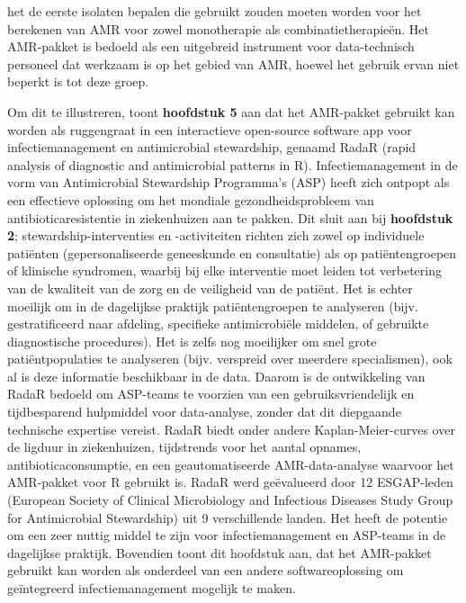 \documentclass[
]{book}
\begin{document}
het de eerste isolaten bepalen die gebruikt zouden moeten worden voor het berekenen van AMR voor zowel monotherapie als combinatietherapieën. Het AMR-pakket is bedoeld als een uitgebreid instrument voor data-technisch personeel dat werkzaam is op het gebied van AMR, hoewel het gebruik ervan niet beperkt is tot deze groep.

Om dit te illustreren, toont \textbf{hoofdstuk 5} aan dat het AMR-pakket gebruikt kan worden als ruggengraat in een interactieve open-source software app voor infectiemanagement en antimicrobial stewardship, genaamd RadaR (rapid analysis of diagnostic and antimicrobial patterns in R). Infectiemanagement in de vorm van Antimicrobial Stewardship Programma's (ASP) heeft zich ontpopt als een effectieve oplossing om het mondiale gezondheidsprobleem van antibioticaresistentie in ziekenhuizen aan te pakken. Dit sluit aan bij \textbf{hoofdstuk 2}; stewardship-interventies en -activiteiten richten zich zowel op individuele patiënten (gepersonaliseerde geneeskunde en consultatie) als op patiëntengroepen of klinische syndromen, waarbij bij elke interventie moet leiden tot verbetering van de kwaliteit van de zorg en de veiligheid van de patiënt. Het is echter moeilijk om in de dagelijkse praktijk patiëntengroepen te analyseren (bijv. gestratificeerd naar afdeling, specifieke antimicrobiële middelen, of gebruikte diagnostische procedures). Het is zelfs nog moeilijker om snel grote patiëntpopulaties te analyseren (bijv. verspreid over meerdere specialismen), ook al is deze informatie beschikbaar in de data. Daarom is de ontwikkeling van RadaR bedoeld om ASP-teams te voorzien van een gebruiksvriendelijk en tijdbesparend hulpmiddel voor data-analyse, zonder dat dit diepgaande technische expertise vereist. RadaR biedt onder andere Kaplan-Meier-curves over de ligduur in ziekenhuizen, tijdstrends voor het aantal opnames, antibioticaconsumptie, en een geautomatiseerde AMR-data-analyse waarvoor het AMR-pakket voor R gebruikt is. RadaR werd geëvalueerd door 12 ESGAP-leden (European Society of Clinical Microbiology and Infectious Diseases Study Group for Antimicrobial Stewardship) uit 9 verschillende landen. Het heeft de potentie om een zeer nuttig middel te zijn voor infectiemanagement en ASP-teams in de dagelijkse praktijk. Bovendien toont dit hoofdstuk aan, dat het AMR-pakket gebruikt kan worden als onderdeel van een andere softwareoplossing om geïntegreerd infectiemanagement mogelijk te maken.
\end{document}
